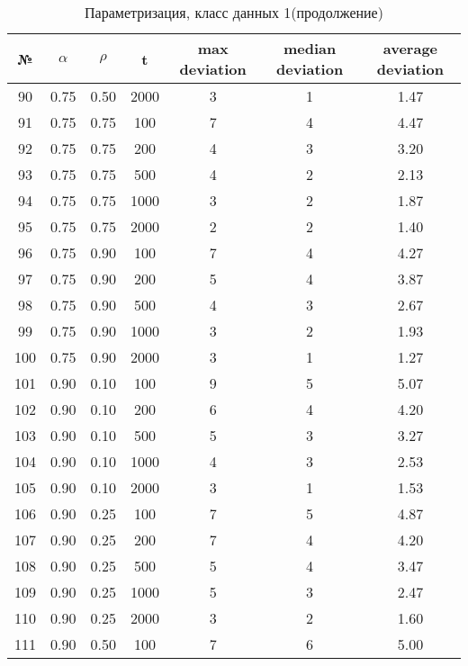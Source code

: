 \documentclass[a4paper, 12pt, unknownkeysallowed]{extreport}
\begin{document}
\begin{center}
  \captionsetup{justification=raggedright,singlelinecheck=off}
  \begin{longtable}[c]{|c|c|c|c|c|c|c|}
    \caption{Параметризация, класс данных 1(продолжение)\label{tbl:p_1_3}} \\ \hline
    № & $\alpha$ & $\rho$ & t & max deviation & median deviation & average deviation \\ \hline   
    90 & 0.75 & 0.50 &  2000 &    3 &    1 &  1.47 \\ \hline
    91 & 0.75 & 0.75 &   100 &    7 &    4 &  4.47 \\ \hline
    92 & 0.75 & 0.75 &   200 &    4 &    3 &  3.20 \\ \hline
    93 & 0.75 & 0.75 &   500 &    4 &    2 &  2.13 \\ \hline
    94 & 0.75 & 0.75 &  1000 &    3 &    2 &  1.87 \\ \hline
    95 & 0.75 & 0.75 &  2000 &    2 &    2 &  1.40 \\ \hline
    96 & 0.75 & 0.90 &   100 &    7 &    4 &  4.27 \\ \hline
    97 & 0.75 & 0.90 &   200 &    5 &    4 &  3.87 \\ \hline
    98 & 0.75 & 0.90 &   500 &    4 &    3 &  2.67 \\ \hline
    99 & 0.75 & 0.90 &  1000 &    3 &    2 &  1.93 \\ \hline
   100 & 0.75 & 0.90 &  2000 &    3 &    1 &  1.27 \\ \hline
   101 & 0.90 & 0.10 &   100 &    9 &    5 &  5.07 \\ \hline
   102 & 0.90 & 0.10 &   200 &    6 &    4 &  4.20 \\ \hline
   103 & 0.90 & 0.10 &   500 &    5 &    3 &  3.27 \\ \hline
   104 & 0.90 & 0.10 &  1000 &    4 &    3 &  2.53 \\ \hline
   105 & 0.90 & 0.10 &  2000 &    3 &    1 &  1.53 \\ \hline
   106 & 0.90 & 0.25 &   100 &    7 &    5 &  4.87 \\ \hline
   107 & 0.90 & 0.25 &   200 &    7 &    4 &  4.20 \\ \hline
   108 & 0.90 & 0.25 &   500 &    5 &    4 &  3.47 \\ \hline
   109 & 0.90 & 0.25 &  1000 &    5 &    3 &  2.47 \\ \hline
   110 & 0.90 & 0.25 &  2000 &    3 &    2 &  1.60 \\ \hline
   111 & 0.90 & 0.50 &   100 &    7 &    6 &  5.00 \\ \hline

\end{longtable}
\end{center}
\end{document}
